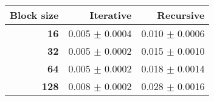 \begin{tabular}{rrr}\toprule
\textbf{Block size}  & \textbf{Iterative} & \textbf{Recursive}\\\midrule
\textbf{16}  & 0.005 $\pm$ 0.0004 & 0.010 $\pm$ 0.0006\\
\textbf{32}  & 0.005 $\pm$ 0.0002 & 0.015 $\pm$ 0.0010\\
\textbf{64}  & 0.005 $\pm$ 0.0002 & 0.018 $\pm$ 0.0014\\
\textbf{128} & 0.008 $\pm$ 0.0002 & 0.028 $\pm$ 0.0016\\
\bottomrule
\end{tabular}
